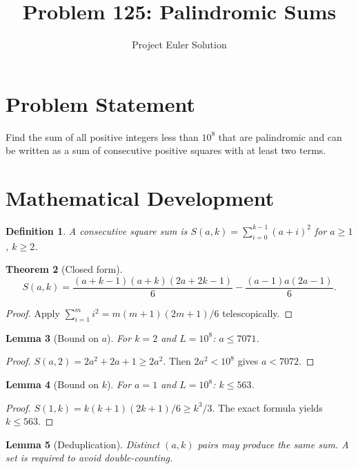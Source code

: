 \documentclass[11pt,a4paper]{article}
\title{Problem 125: Palindromic Sums}
\author{Project Euler Solution}
\date{}
\newtheorem{theorem}{Theorem}
\newtheorem{lemma}[theorem]{Lemma}
\newtheorem{definition}[theorem]{Definition}
\begin{document}
\maketitle

\section{Problem Statement}

Find the sum of all positive integers less than $10^8$ that are palindromic and can be written as a sum of consecutive positive squares with at least two terms.

\section{Mathematical Development}

\begin{definition}
A consecutive square sum is $S(a, k) = \sum_{i=0}^{k-1}(a+i)^2$ for $a \ge 1$, $k \ge 2$.
\end{definition}

\begin{theorem}[Closed form]
\[
S(a, k) = \frac{(a+k-1)(a+k)(2a+2k-1)}{6} - \frac{(a-1)a(2a-1)}{6}.
\]
\end{theorem}

\begin{proof}
Apply $\sum_{i=1}^{m} i^2 = m(m+1)(2m+1)/6$ telescopically.
\end{proof}

\begin{lemma}[Bound on $a$]
For $k = 2$ and $L = 10^8$: $a \le 7071$.
\end{lemma}

\begin{proof}
$S(a, 2) = 2a^2 + 2a + 1 \ge 2a^2$. Then $2a^2 < 10^8$ gives $a < 7072$.
\end{proof}

\begin{lemma}[Bound on $k$]
For $a = 1$ and $L = 10^8$: $k \le 563$.
\end{lemma}

\begin{proof}
$S(1, k) = k(k+1)(2k+1)/6 \ge k^3/3$. The exact formula yields $k \le 563$.
\end{proof}

\begin{lemma}[Deduplication]
Distinct $(a, k)$ pairs may produce the same sum. A set is required to avoid double-counting.
\end{lemma}
\end{document}
